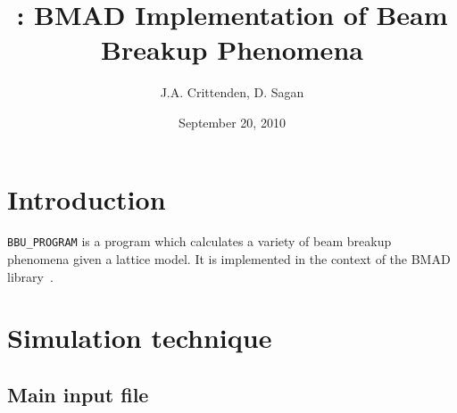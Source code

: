 \documentclass[11pt]{article}
\title{ {\bbup}: BMAD Implementation of Beam Breakup Phenomena}
\author{J.A. Crittenden, D. Sagan}
\date{September 20, 2010}
\newcommand{\bbup}{\texttt{BBU_PROGRAM}\xspace}
\begin{document}
\maketitle

\section{Introduction} 

\bbup is a program which calculates a variety of beam breakup phenomena
given a lattice model. It is implemented in the context of the BMAD library~\cite{ref:bmad}.

\section{Simulation technique}
\subsection{Main input file} 
\end{document}
